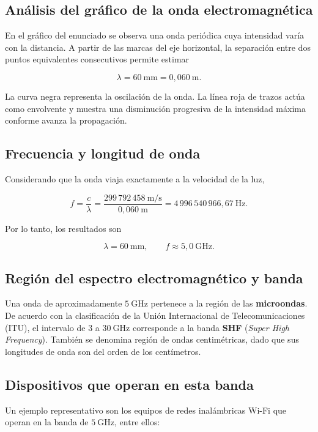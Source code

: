 \documentclass[12pt,a4paper]{article}
\begin{document}
\subsection{Análisis del gráfico de la onda electromagnética}

En el gráfico del enunciado se observa una onda periódica cuya intensidad varía
con la distancia. A partir de las marcas del eje horizontal, la separación
entre dos puntos equivalentes consecutivos permite estimar

\[
\lambda=60\ \mathrm{mm}=0{,}060\ \mathrm{m}.
\]

La curva negra representa la oscilación de la onda. La línea roja de trazos
actúa como envolvente y muestra una disminución progresiva de la intensidad
máxima conforme avanza la propagación.

\subsection{Frecuencia y longitud de onda}

Considerando que la onda viaja exactamente a la velocidad de la luz,

\[
f=\frac{c}{\lambda}
=\frac{299\,792\,458\ \mathrm{m/s}}{0{,}060\ \mathrm{m}}
=4\,996\,540\,966{,}67\ \mathrm{Hz}.
\]

Por lo tanto, los resultados son

\[
\boxed{\lambda=60\ \mathrm{mm}},\qquad
\boxed{f\approx 5{,}0\ \mathrm{GHz}}.
\]

\subsection{Región del espectro electromagnético y banda}

Una onda de aproximadamente $5\ \mathrm{GHz}$ pertenece a la región de las
\textbf{microondas}. De acuerdo con la clasificación de la Unión Internacional
de Telecomunicaciones (ITU), el intervalo de $3$ a $30\ \mathrm{GHz}$
corresponde a la banda \textbf{SHF} (\emph{Super High Frequency}). También se
denomina región de ondas centimétricas, dado que sus longitudes de onda son del
orden de los centímetros.

\subsection{Dispositivos que operan en esta banda}

Un ejemplo representativo son los equipos de redes inalámbricas Wi-Fi que
operan en la banda de $5\ \mathrm{GHz}$, entre ellos:
\end{document}
